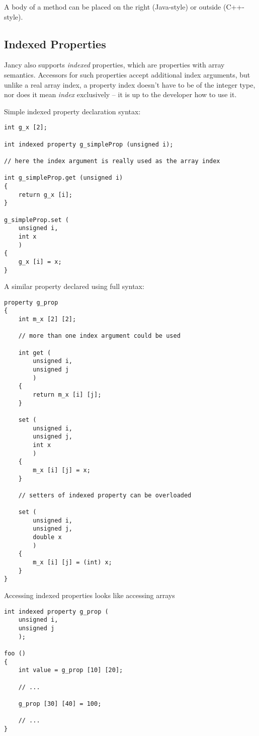 \documentclass[oneside]{book}
\begin{document}
A body of a method can be placed on the right (Java-style) or outside (C++-style).

\subsection{Indexed Properties}
Jancy also supports \emph{indexed} properties, which are properties with array semantics. Accessors for such properties accept additional index arguments, but unlike a real array index, a property index doesn't have to be of the integer type, nor does it mean \emph{index} exclusively -- it is up to the developer how to use it.

Simple indexed property declaration syntax:

\begin{lstlisting}
int g_x [2];

int indexed property g_simpleProp (unsigned i);

// here the index argument is really used as the array index

int g_simpleProp.get (unsigned i)
{
    return g_x [i];
}

g_simpleProp.set (
    unsigned i,
    int x
    )
{
    g_x [i] = x;
}
\end{lstlisting}

A similar property declared using full syntax:

\begin{lstlisting}
property g_prop
{   
    int m_x [2] [2];

    // more than one index argument could be used

    int get (
        unsigned i,
        unsigned j
        )
    {
        return m_x [i] [j];
    }

    set (
        unsigned i,
        unsigned j,
        int x
        )
    {
        m_x [i] [j] = x;
    }

    // setters of indexed property can be overloaded

    set (
        unsigned i,
        unsigned j,
        double x
        )
    {
        m_x [i] [j] = (int) x;
    }
}
\end{lstlisting}

Accessing indexed properties looks like accessing arrays

\begin{lstlisting}
int indexed property g_prop (
    unsigned i,
    unsigned j
    );

foo ()
{
    int value = g_prop [10] [20];

    // ...

    g_prop [30] [40] = 100;

    // ...
}
\end{lstlisting}
\end{document}
